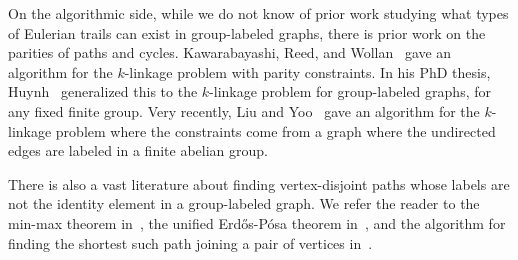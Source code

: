 \documentclass[a4paper, 12pt]{article}
\newcommand{\RMM}[1]{\textcolor{orange}{RM: #1}}
\newcommand{\CMin}[1]{\todo[inline,bordercolor=white,color=Magenta,backgroundcolor=CornflowerBlue!40,textcolor=black,size=\footnotesize]{\textsf{CM: #1}}}
\begin{document}
On the algorithmic side, while we do not know of prior work studying what types of Eulerian trails can exist in group-labeled graphs, there is prior work on the parities of paths and cycles. Kawarabayashi, Reed, and Wollan~\cite{kawarabayashi2011graph} gave an algorithm for the $k$-linkage problem with parity constraints. In his PhD thesis, Huynh~\cite{huynh2009linkage} generalized this to the $k$-linkage problem for group-labeled graphs, for any fixed finite group. Very recently, Liu and Yoo~\cite{liu2025disjoint} gave an algorithm for the $k$-linkage problem where the constraints come from a graph where the {undirected} edges are labeled in a finite abelian group. 

There is also a vast literature about finding vertex-disjoint paths whose labels are not the identity element in a group-labeled graph. We refer the reader to the min-max theorem in~\cite{ChudnovskyAPathsAlg, ChudnovskyAPaths}, the unified Erdős-Pósa theorem in~\cite{huynh2019unified}, and the algorithm for finding the shortest such path joining a pair of vertices in~\cite{IwataYamaguchiShortestNonzeroPath}. 



    
\end{document}
